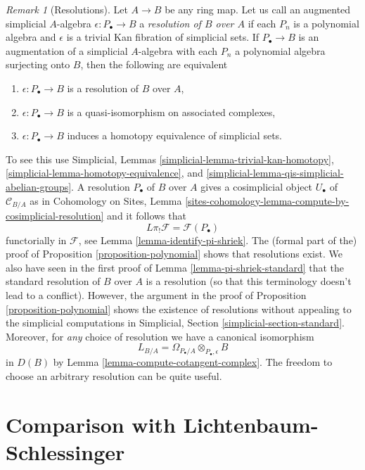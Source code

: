 \documentclass[10pt,a4paper]{amsart}
\theoremstyle{plain}
\theoremstyle{definition}
\theoremstyle{remark}
\newtheorem{remark}[subsection]{Remark}
\numberwithin{equation}{subsection}
\begin{document}
\begin{remark}[Resolutions]
\label{remark-resolution}
Let $A \to B$ be any ring map. Let us call an augmented simplicial $A$-algebra
$\epsilon : P_\bullet \to B$ a {\it resolution of $B$ over $A$} if
each $P_n$ is a polynomial algebra and $\epsilon$ is a trivial Kan fibration
of simplicial sets. If $P_\bullet \to B$ is an augmentation of a simplicial
$A$-algebra with each $P_n$ a polynomial algebra surjecting onto $B$, then
the following are equivalent
\begin{enumerate}
\item $\epsilon : P_\bullet \to B$ is a resolution of $B$ over $A$,
\item $\epsilon : P_\bullet \to B$ is a quasi-isomorphism on
associated complexes,
\item $\epsilon : P_\bullet \to B$ induces a homotopy equivalence
of simplicial sets.
\end{enumerate}
To see this use Simplicial, Lemmas
\ref{simplicial-lemma-trivial-kan-homotopy},
\ref{simplicial-lemma-homotopy-equivalence}, and
\ref{simplicial-lemma-qis-simplicial-abelian-groups}.
A resolution $P_\bullet$ of $B$ over $A$ gives a cosimplicial object
$U_\bullet$ of $\mathcal{C}_{B/A}$ as in Cohomology on Sites, Lemma
\ref{sites-cohomology-lemma-compute-by-cosimplicial-resolution}
and it follows that
$$
L\pi_!\mathcal{F} = \mathcal{F}(P_\bullet)
$$
functorially in $\mathcal{F}$, see Lemma \ref{lemma-identify-pi-shriek}.
The (formal part of the) proof of Proposition \ref{proposition-polynomial}
shows that resolutions exist. We also have seen in the first proof of
Lemma \ref{lemma-pi-shriek-standard} that the standard resolution of $B$
over $A$ is a resolution (so that this terminology doesn't lead to a conflict).
However, the argument in the proof of Proposition \ref{proposition-polynomial}
shows the existence of resolutions without appealing to the simplicial
computations in Simplicial, Section \ref{simplicial-section-standard}.
Moreover, for {\it any} choice of resolution we have a canonical isomorphism
$$
L_{B/A} = \Omega_{P_\bullet/A} \otimes_{P_\bullet, \epsilon} B
$$
in $D(B)$ by Lemma \ref{lemma-compute-cotangent-complex}. The freedom to
choose an arbitrary resolution can be quite useful.
\end{remark}

\section{Comparison with Lichtenbaum-Schlessinger}
\label{section-compare-higher}
\end{document}

